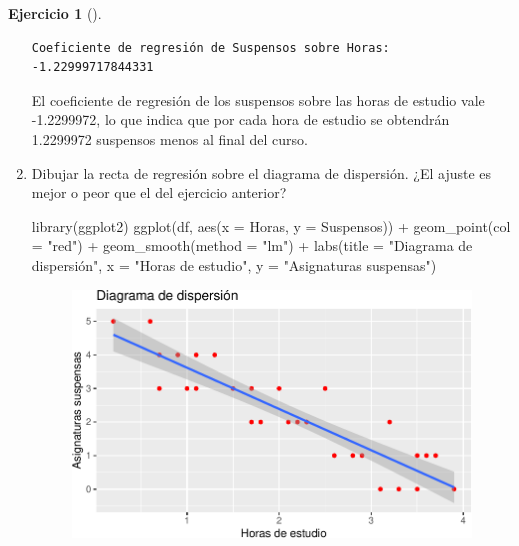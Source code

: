 \documentclass[
  a4paper,
]{scrreport}
\newenvironment{Shaded}{\begin{snugshade}}{\end{snugshade}}
\newcommand{\AttributeTok}[1]{\textcolor[rgb]{0.40,0.45,0.13}{#1}}
\newcommand{\FunctionTok}[1]{\textcolor[rgb]{0.28,0.35,0.67}{#1}}
\newcommand{\NormalTok}[1]{\textcolor[rgb]{0.00,0.23,0.31}{#1}}
\newcommand{\SpecialCharTok}[1]{\textcolor[rgb]{0.37,0.37,0.37}{#1}}
\newcommand{\StringTok}[1]{\textcolor[rgb]{0.13,0.47,0.30}{#1}}
\theoremstyle{definition}
\newtheorem{exercise}{Ejercicio}[chapter]
\theoremstyle{remark}
\begin{document}
\begin{exercise}[]
\begin{enumerate}
\begin{tcolorbox}
\begin{verbatim}
Coeficiente de regresión de Suspensos sobre Horas: -1.22999717844331
\end{verbatim}

  El coeficiente de regresión de los suspensos sobre las horas de
  estudio vale -1.2299972, lo que indica que por cada hora de estudio se
  obtendrán 1.2299972 suspensos menos al final del curso.

  \end{tcolorbox}
\item
  Dibujar la recta de regresión sobre el diagrama de dispersión. ¿El
  ajuste es mejor o peor que el del ejercicio anterior?

  \begin{tcolorbox}[enhanced jigsaw, coltitle=black, left=2mm, colback=white, leftrule=.75mm, toptitle=1mm, breakable, bottomrule=.15mm, titlerule=0mm, bottomtitle=1mm, title=\textcolor{quarto-callout-tip-color}{\faLightbulb}\hspace{0.5em}{Solución}, arc=.35mm, toprule=.15mm, rightrule=.15mm, colframe=quarto-callout-tip-color-frame, opacityback=0, colbacktitle=quarto-callout-tip-color!10!white, opacitybacktitle=0.6]

\begin{Shaded}
\begin{Highlighting}[]
\FunctionTok{library}\NormalTok{(ggplot2)}
\FunctionTok{ggplot}\NormalTok{(df, }\FunctionTok{aes}\NormalTok{(}\AttributeTok{x =}\NormalTok{ Horas, }\AttributeTok{y =}\NormalTok{ Suspensos)) }\SpecialCharTok{+}
    \FunctionTok{geom\_point}\NormalTok{(}\AttributeTok{col =} \StringTok{"red"}\NormalTok{) }\SpecialCharTok{+}
    \FunctionTok{geom\_smooth}\NormalTok{(}\AttributeTok{method =} \StringTok{"lm"}\NormalTok{) }\SpecialCharTok{+}
    \FunctionTok{labs}\NormalTok{(}\AttributeTok{title =} \StringTok{"Diagrama de dispersión"}\NormalTok{, }\AttributeTok{x =} \StringTok{"Horas de estudio"}\NormalTok{, }\AttributeTok{y =} \StringTok{"Asignaturas suspensas"}\NormalTok{)}
\end{Highlighting}
\end{Shaded}

  \begin{figure}[H]

  {\centering \includegraphics{05-regresion_files/figure-pdf/unnamed-chunk-14-1.pdf}

}
\end{figure}
\end{tcolorbox}
\end{enumerate}
\end{exercise}
\end{document}
